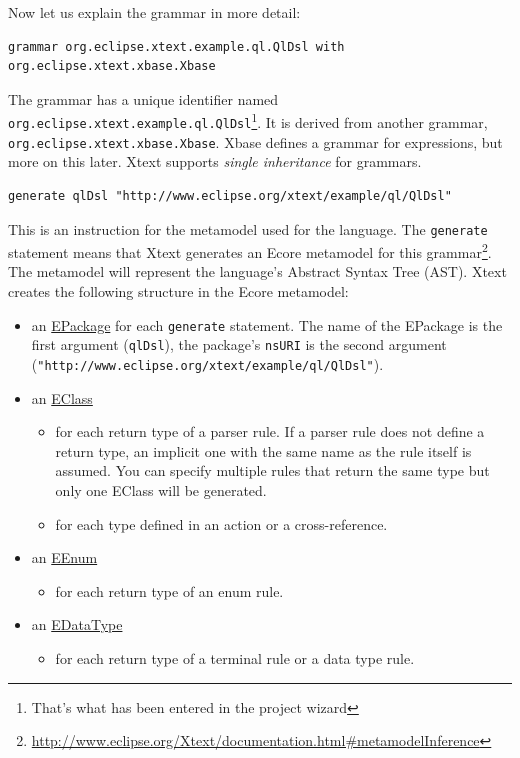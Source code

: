 Now let us explain the grammar in more detail:

\begin{lstlisting}[language=Xtext]
grammar org.eclipse.xtext.example.ql.QlDsl with org.eclipse.xtext.xbase.Xbase
\end{lstlisting}

The grammar has a unique identifier named
\texttt{org.eclipse.xtext.example.ql.QlDsl}\footnote{That's what has been
entered in the project wizard}. It is derived from another grammar,
\texttt{org.eclipse.xtext.xbase.Xbase}. Xbase defines a grammar for expressions,
but more on this later. Xtext supports \emph{single inheritance} for grammars.

\begin{lstlisting}[language=Xtext]
generate qlDsl "http://www.eclipse.org/xtext/example/ql/QlDsl"
\end{lstlisting}

This is an instruction for the metamodel used for the language. The
\texttt{generate} statement means that Xtext generates an Ecore metamodel for
this
grammar\footnote{\url{http://www.eclipse.org/Xtext/documentation.html\#metamodelInference}}.
The metamodel will represent the language's Abstract Syntax Tree
(AST). Xtext creates the following structure in the Ecore metamodel:
\begin{itemize}
  \item an
  \href{http://download.eclipse.org/modeling/emf/emf/javadoc/2.7.0/org/eclipse/emf/ecore/EPackage.html}{EPackage}
  for each \texttt{generate} statement. The name of the EPackage is the first
  argument (\texttt{qlDsl}), the package's \texttt{nsURI} is the second argument
  \newline(\texttt{"http://www.eclipse.org/xtext/example/ql/QlDsl"}).
  \item an
  \href{http://download.eclipse.org/modeling/emf/emf/javadoc/2.7.0/org/eclipse/emf/ecore/EClass.html}{EClass}
	\begin{itemize}
		\item for each return type of a parser rule. 
		If a parser rule does not define a return type, an implicit one with the same name as the rule itself is assumed. You can specify multiple rules that return the same type but only one EClass will be generated.
		\item for each type defined in an action or a cross-reference.
	\end{itemize}
  \item an
  \href{http://download.eclipse.org/modeling/emf/emf/javadoc/2.7.0/org/eclipse/emf/ecore/EEnum.html}{EEnum}
	\begin{itemize}
		\item for each return type of an enum rule. 
	\end{itemize}
  \item an
  \href{http://download.eclipse.org/modeling/emf/emf/javadoc/2.7.0/org/eclipse/emf/ecore/EDataType.html}{EDataType}
	\begin{itemize}
		\item for each return type of a terminal rule or a data type rule. 
	\end{itemize}
\end{itemize}

